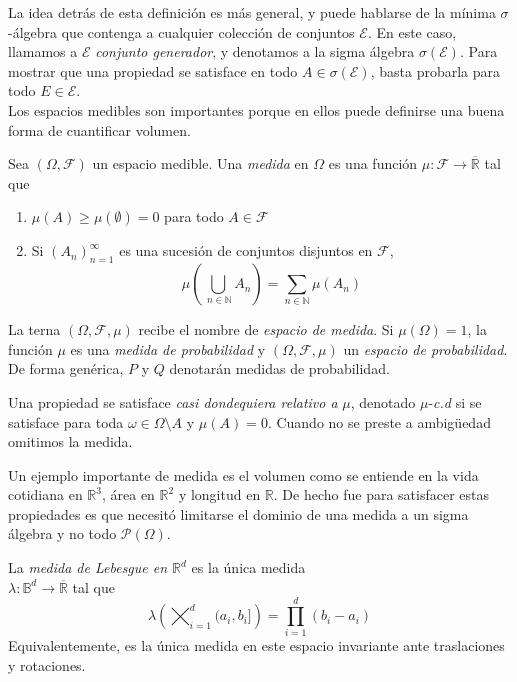 \documentclass[main.tex]{subfiles}
\begin{document}
La idea detrás de esta definición es más general, y puede hablarse de la mínima $\sigma$-álgebra que contenga a cualquier colección de conjuntos $\mathcal{E}$. En este caso, llamamos a $\mathcal{E}$ \textit{conjunto generador}, y denotamos a la sigma álgebra $\sigma(\mathcal{E})$. Para mostrar que una propiedad se satisface en todo $A\in\sigma(\mathcal{E})$, basta probarla para todo $E\in\mathcal{E}$. \\

Los espacios medibles son importantes porque en ellos puede definirse una buena forma de cuantificar volumen.

\begin{definition}
Sea $(\Omega, \mathcal{F})$ un espacio medible. Una \textit{medida} en $\Omega$ es una función $\mu: \mathcal{F} \to \overline{\mathbb{R}}$ tal que
\begin{enumerate}[label=\roman*.]
	\item $\mu(A)\geq \mu(\emptyset)=0$ para todo $A\in\mathcal{F}$
	\item Si $(A_n)_{n=1}^\infty$ es una sucesión de conjuntos disjuntos en $\mathcal{F}$, 
	\begin{equation*}
	\mu\left(\bigcup_{\ n\in\mathbb{N}}A_n\right)=
	\sum_{n\in\mathbb{N}}\mu(A_n)	
	\end{equation*}
\end{enumerate}
La terna $(\Omega, \mathcal{F}, \mu)$ recibe el nombre de \textit{espacio de medida}. Si $\mu(\Omega)=1$, la función $\mu$ es una \textit{medida de probabilidad} y $(\Omega, \mathcal{F}, \mu)$ un \textit{espacio de probabilidad}. De forma genérica, $P$ y $Q$ denotarán medidas de probabilidad.
\end{definition} 

\begin{definition}
Una propiedad se satisface \textit{casi dondequiera relativo a} $\mu$, denotado $\mu$-\textit{c.d} si se satisface para toda $\omega\in \Omega\setminus A$ y $\mu(A)=0$. Cuando no se preste a ambigüedad  omitimos la medida.
\end{definition}

Un ejemplo importante de medida es el volumen como se entiende en la vida cotidiana en $\mathbb{R}^3$, área en $\mathbb{R}^2$ y longitud en $\mathbb{R}$. De hecho fue para satisfacer estas propiedades es que necesitó limitarse el dominio de una medida a un sigma álgebra y no todo $\mathcal{P}(\Omega)$. 

\begin{definition}
	La \textit{medida de Lebesgue en $\mathbb{R}^d$} es la única medida \\ $\lambda:\mathbb{B}^d\to\overline{\mathbb{R}}$ tal que
	\begin{equation*}
		\lambda\left(\bigtimes_{i=1}^d (a_i, b_i]\right)	= \prod_{i=1}^d(b_i-a_i)
	\end{equation*}
	Equivalentemente, es la única medida en este espacio invariante ante traslaciones y rotaciones. 
\end{definition}
\end{document}
